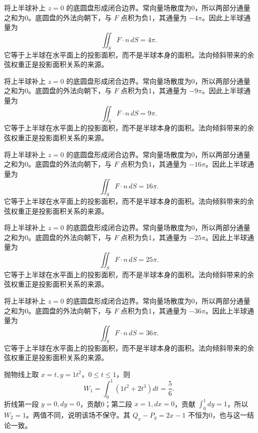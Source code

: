 \documentclass[12pt,fontset=fandol]{ctexart}
\begin{document}
\begin{solve}\label{ans:c42q14}
将上半球补上 $z=0$ 的底圆盘形成闭合边界。常向量场散度为0，所以两部分通量之和为0。底圆盘的外法向朝下，与 $F$ 点积为负1，其通量为 $-4\pi$。因此上半球通量为
\[
\iint_SF\cdot n\,dS=4\pi.
\]
它等于上半球在水平面上的投影面积，而不是半球本身的面积。法向倾斜带来的余弦权重正是投影面积关系的来源。
\end{solve}

\begin{solve}\label{ans:c42q15}
将上半球补上 $z=0$ 的底圆盘形成闭合边界。常向量场散度为0，所以两部分通量之和为0。底圆盘的外法向朝下，与 $F$ 点积为负1，其通量为 $-9\pi$。因此上半球通量为
\[
\iint_SF\cdot n\,dS=9\pi.
\]
它等于上半球在水平面上的投影面积，而不是半球本身的面积。法向倾斜带来的余弦权重正是投影面积关系的来源。
\end{solve}

\begin{solve}\label{ans:c42q16}
将上半球补上 $z=0$ 的底圆盘形成闭合边界。常向量场散度为0，所以两部分通量之和为0。底圆盘的外法向朝下，与 $F$ 点积为负1，其通量为 $-16\pi$。因此上半球通量为
\[
\iint_SF\cdot n\,dS=16\pi.
\]
它等于上半球在水平面上的投影面积，而不是半球本身的面积。法向倾斜带来的余弦权重正是投影面积关系的来源。
\end{solve}

\begin{solve}\label{ans:c42q17}
将上半球补上 $z=0$ 的底圆盘形成闭合边界。常向量场散度为0，所以两部分通量之和为0。底圆盘的外法向朝下，与 $F$ 点积为负1，其通量为 $-25\pi$。因此上半球通量为
\[
\iint_SF\cdot n\,dS=25\pi.
\]
它等于上半球在水平面上的投影面积，而不是半球本身的面积。法向倾斜带来的余弦权重正是投影面积关系的来源。
\end{solve}

\begin{solve}\label{ans:c42q18}
将上半球补上 $z=0$ 的底圆盘形成闭合边界。常向量场散度为0，所以两部分通量之和为0。底圆盘的外法向朝下，与 $F$ 点积为负1，其通量为 $-36\pi$。因此上半球通量为
\[
\iint_SF\cdot n\,dS=36\pi.
\]
它等于上半球在水平面上的投影面积，而不是半球本身的面积。法向倾斜带来的余弦权重正是投影面积关系的来源。
\end{solve}

\begin{solve}\label{ans:c42q19}
抛物线上取 $x=t,y=1t^2$，$0\le t\le1$，则
\[
W_1=\int_0^1(1t^2+2t^3)dt=\frac{5}{6}.
\]
折线第一段 $y=0,dy=0$，贡献0；第二段 $x=1,dx=0$，贡献 $\int_0^{1}dy=1$，所以 $W_2=1$。两值不同，说明该场不保守。其 $Q_x-P_y=2x-1$ 不恒为0，也与这一结论一致。
\end{solve}
\end{document}
